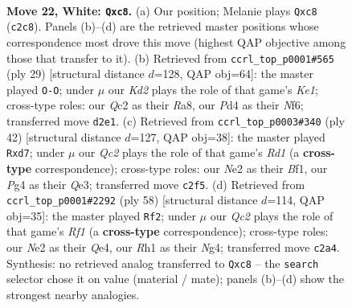 \documentclass[11pt]{article}
\begin{document}
\clearpage

\begin{figure}[p]\centering
\begin{subfigure}{0.46\textwidth}\centering
\resizebox{\linewidth}{!}{%
\newchessgame
\chessboard[
  setfen={rnb5/pp4kp/4r2p/1P1q2b1/3P2P1/4PP2/2QKN3/R4B1R w - - 0 22},
  showmover=false,
  pgfstyle=straightmove, color=movearrow, markmove={c2-c8}
]}
\caption{}
\end{subfigure}\hfill
\begin{subfigure}{0.46\textwidth}\centering
\resizebox{\linewidth}{!}{%
\newchessgame
\chessboard[
  setfen={r3k2r/pp2ppb1/5np1/6p1/1PQB4/q5P1/P4PBP/R3K2R b KQkq - 0 15},
  showmover=false,
  pgfstyle=straightmove, color=movearrow, markmove={e8-g8}
]}
\caption{}
\end{subfigure}
\\[4pt]
\begin{subfigure}{0.46\textwidth}\centering
\resizebox{\linewidth}{!}{%
\newchessgame
\chessboard[
  setfen={rr4k1/p2npp1p/2p1b1p1/8/N1P3PP/qP2QP2/P7/1K1R1B1R w - - 5 22},
  showmover=false,
  pgfstyle=straightmove, color=movearrow, markmove={d1-d7}
]}
\caption{}
\end{subfigure}\hfill
\begin{subfigure}{0.46\textwidth}\centering
\resizebox{\linewidth}{!}{%
\newchessgame
\chessboard[
  setfen={1r4k1/3b1rpp/4p1n1/ppR5/1q1PQPN1/1P5P/P6K/2B2R2 w - - 4 30},
  showmover=false,
  pgfstyle=straightmove, color=movearrow, markmove={f1-f2}
]}
\caption{}
\end{subfigure}
\caption{\textbf{Move 22, White: \texttt{Qxc8}.} (a) Our position; Melanie plays \texttt{Qxc8} (\texttt{c2c8}). Panels (b)--(d) are the retrieved master positions whose correspondence most drove this move (highest QAP objective among those that transfer to it). (b) Retrieved from \texttt{ccrl\_top\_p0001\#565} (ply 29) [structural distance $d$=128, QAP obj=64]: the master played \texttt{O-O}; under $\mu$ our \emph{Kd2} plays the role of that game's \emph{Ke1}; cross-type roles: our \emph{Q}c2 as their \emph{R}a8, our \emph{P}d4 as their \emph{N}f6; transferred move \texttt{d2e1}. (c) Retrieved from \texttt{ccrl\_top\_p0003\#340} (ply 42) [structural distance $d$=127, QAP obj=38]: the master played \texttt{Rxd7}; under $\mu$ our \emph{Qc2} plays the role of that game's \emph{Rd1} (a \textbf{cross-type} correspondence); cross-type roles: our \emph{N}e2 as their \emph{B}f1, our \emph{P}g4 as their \emph{Q}e3; transferred move \texttt{c2f5}. (d) Retrieved from \texttt{ccrl\_top\_p0001\#2292} (ply 58) [structural distance $d$=114, QAP obj=35]: the master played \texttt{Rf2}; under $\mu$ our \emph{Qc2} plays the role of that game's \emph{Rf1} (a \textbf{cross-type} correspondence); cross-type roles: our \emph{N}e2 as their \emph{Q}e4, our \emph{R}h1 as their \emph{N}g4; transferred move \texttt{c2a4}. Synthesis: no retrieved analog transferred to \texttt{Qxc8} -- the \texttt{search} selector chose it on value (material / mate); panels (b)--(d) show the strongest nearby analogies.}
\label{fig:thought-m42}
\end{figure}
\end{document}
